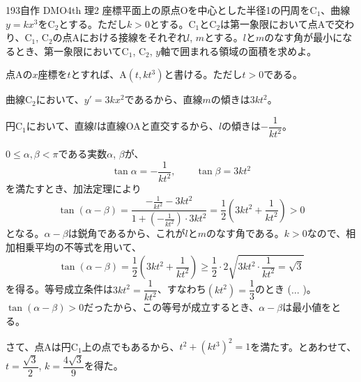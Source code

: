 \begin{thm}{193}{\maru}{自作 DMO4th 理2}
 座標平面上の原点Oを中心とした半径1の円周をC$_1$、曲線$y=kx^3$をC$_2$とする。ただし$k>0$とする。C$_1$とC$_2$は第一象限において点Aで交わり、C$_1$, C$_2$の点Aにおける接線をそれぞれ$l$, $m$とする。$l$と$m$のなす角が最小になるとき、第一象限においてC$_1$, C$_2$, $y$軸で囲まれる領域の面積を求めよ。
\end{thm}

点Aの$x$座標を$t$とすれば、A$(t,kt^3)$と書ける。ただし$t>0$である。

曲線C$_2$において、$y'=3kx^2$であるから、直線$m$の傾きは$3kt^2$。

円C$_1$において、直線$l$は直線OAと直交するから、$l$の傾きは$-\dfrac{1}{kt^2}$。

$0\le \alpha, \beta < \pi$である実数$\alpha$, $\beta$が、
\[ \tan\alpha=-\frac{1}{kt^2},\qquad \tan\beta=3kt^2 \]
を満たすとき、加法定理により
\[\tan(\alpha-\beta)=\frac{-\frac{1}{kt^2}-3kt^2}{1+\left(-\frac{1}{kt^2}\right)\cdot 3kt^2}=\frac{1}{2}(3kt^2+\frac{1}{kt^2})>0 \]
となる。$\alpha-\beta$は鋭角であるから、これが$l$と$m$のなす角である。$k>0$なので、相加相乗平均の不等式を用いて、
\[ \tan(\alpha-\beta)=\frac{1}{2}\left(3kt^2+\frac{1}{kt^2}\right)\geq \frac{1}{2}\cdot 2\sqrt{3kt^2\cdot\frac{1}{kt^2}=\sqrt{3}} \]
を得る。等号成立条件は$3kt^2=\dfrac{1}{kt^2}$、すなわち$(kt^2)=\dfrac{1}{3}$のとき ($\ldots$ )。$\tan(\alpha-\beta)>0$だったから、この等号が成立するとき、$\alpha-\beta$は最小値をとる。

さて、点Aは円C$_1$上の点でもあるから、$t^2+(kt^3)^2=1$を満たす。とあわせて、$t=\dfrac{\sqrt{3}}{2}$, $k=\dfrac{4\sqrt{3}}{9}$を得た。

